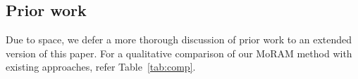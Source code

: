 \subsection{Prior work}
\label{sec:prior}

Due to space, we defer a more thorough discussion of prior work to an extended version of this paper. For a qualitative comparison of our MoRAM method with existing approaches, refer Table~\ref{tab:comp}.

